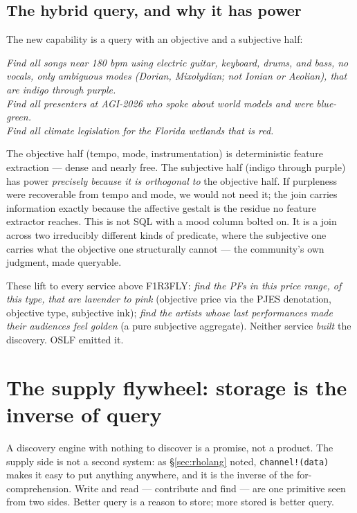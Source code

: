 \documentclass[11pt]{article}
\begin{document}
\subsection*{The hybrid query, and why it has power}

The new capability is a query with an objective and a subjective half:

\begin{keybox}
\emph{Find all songs near 180 bpm using electric guitar, keyboard, drums, and bass, no vocals, only ambiguous modes (Dorian, Mixolydian; not Ionian or Aeolian), that are indigo through purple.}\\[4pt]
\emph{Find all presenters at AGI-2026 who spoke about world models and were blue-green.}\\[4pt]
\emph{Find all climate legislation for the Florida wetlands that is red.}
\end{keybox}

The objective half (tempo, mode, instrumentation) is deterministic feature extraction --- dense and nearly free. The subjective half (indigo through purple) has power \emph{precisely because it is orthogonal to} the objective half. If purpleness were recoverable from tempo and mode, we would not need it; the join carries information exactly because the affective gestalt is the residue no feature extractor reaches. This is not SQL with a mood column bolted on. It is a join across two irreducibly different kinds of predicate, where the subjective one carries what the objective one structurally cannot --- the community's own judgment, made queryable.

These lift to every service above F1R3FLY: \emph{find the PFs in this price range, of this type, that are lavender to pink} (objective price via the PJES denotation, objective type, subjective ink); \emph{find the artists whose last performances made their audiences feel golden} (a pure subjective aggregate). Neither service \emph{built} the discovery. OSLF emitted it.

\section{The supply flywheel: storage is the inverse of query}\label{sec:flywheel}

A discovery engine with nothing to discover is a promise, not a product. The supply side is not a second system: as \S\ref{sec:rholang} noted, \texttt{channel!(data)} makes it easy to put anything anywhere, and it is the inverse of the for-comprehension. Write and read --- contribute and find --- are one primitive seen from two sides. Better query is a reason to store; more stored is better query.
\end{document}
